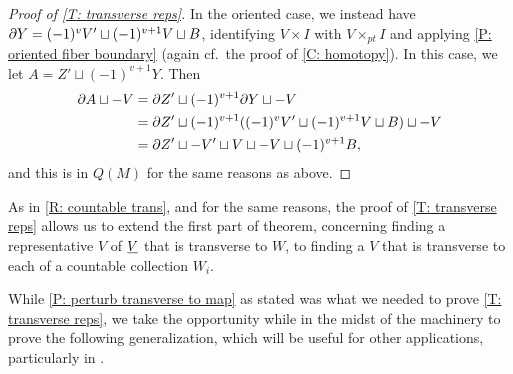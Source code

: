 \begin{proof}[Proof of \cref{T: transverse reps}]
	In the oriented case, we instead have $\partial Y = (-1)^{v} V' \sqcup (-1)^{v+1} V \sqcup B$, identifying $V \times I$ with $V \times_{pt} I$ and applying \cref{P: oriented fiber boundary} (again cf.\ the proof of \cref{C: homotopy}).
	In this case, we let $A = Z' \sqcup (-1)^{v+1} Y$.
	Then
	\begin{align*}
		\partial A \sqcup -V &= \partial Z' \sqcup (-1)^{v+1}\partial Y \sqcup -V\\
		&= \partial Z' \sqcup (-1)^{v+1}((-1)^{v} V' \sqcup (-1)^{v+1} V \sqcup B) \sqcup -V\\
		&= \partial Z' \sqcup -V' \sqcup V \sqcup -V \sqcup (-1)^{v+1}B,
	\end{align*}
	and this is in $Q(M)$ for the same reasons as above.
\end{proof}


\begin{remark}\label{R: countable trans2}
As in \cref{R: countable trans}, and for the same reasons, the proof of \cref{T: transverse reps} allows us to extend the first part of theorem, concerning finding a representative $V$ of $\underline{V}$ that is transverse to $W$, to finding a $V$ that is transverse to each of a countable collection $W_i$.
\end{remark}

While \cref{P: perturb transverse to map} as stated was what we needed to prove \cref{T: transverse reps}, we take the opportunity while in the midst of the machinery to prove the following generalization, which will be useful for other applications, particularly in \cite{GBF47}.

